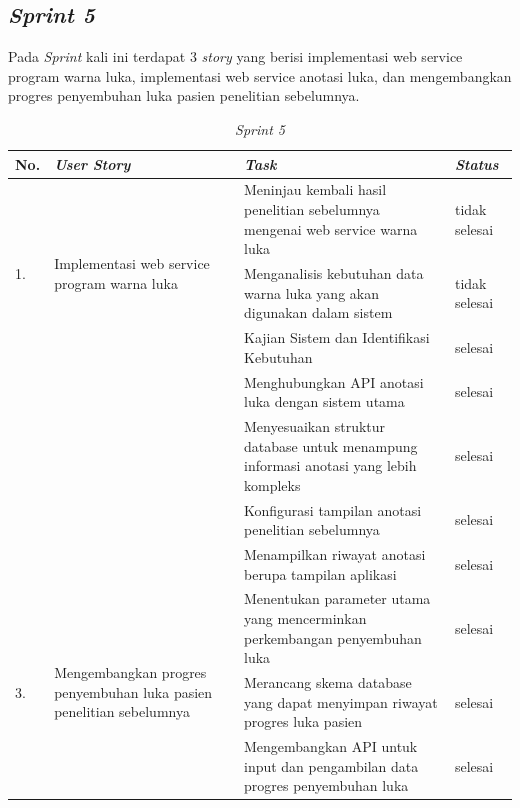 \subsection{\textit{Sprint 5}}
Pada \textit{Sprint} kali ini terdapat 3 \textit{story} yang berisi implementasi web service program warna luka, implementasi web service anotasi luka, dan mengembangkan progres penyembuhan luka pasien penelitian sebelumnya.
	\begin{table}[H]
	\caption{\textit{Sprint 5}}
	\label{sprint5_backlog}
	\begin{tabular}{@{} |p{0.5cm}|p{5cm}|p{5cm}|p{2cm}| @{}}
		\hline
		\textbf{No.} & \textbf{\textit{User Story}} & \textbf{\textit{Task}} & \textbf{\textit{Status}} \\
		\hline
		\multirow{3}{3cm}{1.} & \multirow{3}{5cm}{Implementasi web service program warna luka} & Meninjau kembali hasil penelitian sebelumnya mengenai web service warna luka & tidak selesai\\
		\cline{3-4}
		 & & Menganalisis kebutuhan data warna luka yang akan digunakan dalam sistem & tidak selesai\\
		\hline
		\multirow{3}{3cm}{2.} & \multirow{3}{5cm}{Implementasi web service program warna luka} & Kajian Sistem dan Identifikasi Kebutuhan & selesai\\
		\cline{3-4}
		 & & Menghubungkan API anotasi luka dengan sistem utama & selesai\\
		\cline{3-4}
		& & Menyesuaikan struktur database untuk menampung informasi anotasi yang lebih kompleks & selesai\\
		\cline{3-4}
		& & Konfigurasi tampilan anotasi penelitian sebelumnya & selesai\\
		\cline{3-4}
		& & Menampilkan riwayat anotasi berupa tampilan aplikasi & selesai\\
		\hline
		\multirow{3}{3cm}{3.} & \multirow{3}{5cm}{Mengembangkan progres penyembuhan luka pasien penelitian sebelumnya} & Menentukan parameter utama yang mencerminkan perkembangan penyembuhan luka & selesai\\
		\cline{3-4}
		 & & Merancang skema database yang dapat menyimpan riwayat progres luka pasien & selesai\\
		\cline{3-4}
		& & Mengembangkan API untuk input dan pengambilan data progres penyembuhan luka & selesai\\
		\hline
	\end{tabular}
	\end{table}
	
